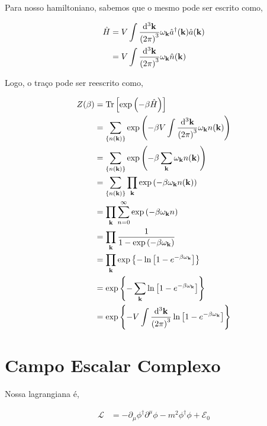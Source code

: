 \documentclass[twoside]{amsart}
\numberwithin{equation}{section}
\begin{document}
Para nosso hamiltoniano, sabemos que o mesmo pode ser escrito como,

\begin{align}
    \hat H&=V\int\frac{\dd[3]{\vb k}}{\qty(2\pi)^3}\omega_{\vb k}{\hat a}^\dagger\qty(\vb k)\hat a\qty(\vb k)\\
    &=V\int\frac{\dd[3]{\vb k}}{\qty(2\pi)^3}\omega_{\vb k}{\hat n}\qty(\vb k)
\end{align}

Logo, o traço pode ser reescrito como,

\begin{align}
    Z\qty(\beta)&=\Tr\qty[\exp\qty(-\beta\hat H)]\\
    &=\sum\limits_{\qty{n\qty(\vb k)}}\exp\qty(-\beta V\int\frac{\dd[3]{\vb k}}{\qty(2\pi)^3}\omega_{\vb k}n\qty(\vb k))\\
    &=\sum\limits_{\qty{n\qty(\vb k)}}\exp\qty(-\beta\sum\limits_{\vb k}\omega_{\vb k}n\qty(\vb k))\\
    &=\sum\limits_{\qty{n\qty(\vb k)}}\prod\limits_{\vb k}\exp\qty(-\beta\omega_{\vb k}n\qty(\vb k))\\
    &=\prod\limits_{\vb k}\sum\limits_{n=0}^\infty\exp\qty(-\beta\omega_{\vb k}n)\\
    &=\prod\limits_{\vb k}\frac{1}{1-\exp\qty(-\beta\omega_{\vb k})}\\
    &=\prod\limits_{\vb k}\exp\qty{-\ln\qty[1-e^{-\beta\omega_{\vb k}}]}\\
    &=\exp\qty{-\sum\limits_{\vb k}\ln\qty[1-e^{-\beta\omega_{\vb k}}]}\\
    &=\exp\qty{-V\int\frac{\dd[3]{\vb k}}{\qty(2\pi)^3}\ln\qty[1-e^{-\beta\omega_{\vb k}}]}
\end{align}



\section{Campo Escalar Complexo}

Nossa lagrangiana é,

\begin{align}
    \mathcal L&=-\partial_\mu\phi^\dagger\partial^\mu\phi-m^2\phi^\dagger\phi+\mathcal E_0
\end{align}
\end{document}
